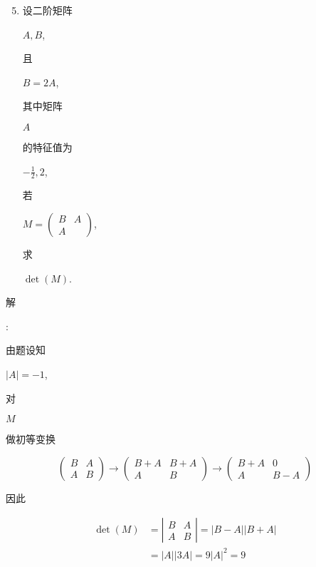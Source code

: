 \documentclass[10pt]{article}
\begin{document}
\begin{enumerate}
  \setcounter{enumi}{4}
  \item \begin{CJK}{UTF8}{mj}设二阶矩阵\end{CJK} $A, B$, \begin{CJK}{UTF8}{mj}且\end{CJK} $B=2 A$, \begin{CJK}{UTF8}{mj}其中矩阵\end{CJK} $A$ \begin{CJK}{UTF8}{mj}的特征值为\end{CJK} $-\frac{1}{2}, 2$, \begin{CJK}{UTF8}{mj}若\end{CJK} $M=\left(\begin{array}{cc}B & A \\ A\end{array}\right)$, \begin{CJK}{UTF8}{mj}求\end{CJK} $\operatorname{det}(M)$.
\end{enumerate}
\begin{CJK}{UTF8}{mj}解\end{CJK}: \begin{CJK}{UTF8}{mj}由题设知\end{CJK} $|A|=-1$, \begin{CJK}{UTF8}{mj}对\end{CJK} $M$ \begin{CJK}{UTF8}{mj}做初等变换\end{CJK}
$$
\left(\begin{array}{ll}
B & A \\
A & B
\end{array}\right) \rightarrow\left(\begin{array}{cc}
B+A & B+A \\
A & B
\end{array}\right) \rightarrow\left(\begin{array}{cc}
B+A & 0 \\
A & B-A
\end{array}\right)
$$
\begin{CJK}{UTF8}{mj}因此\end{CJK}
$$
\begin{aligned}
\operatorname{det}(M) &=\left|\begin{array}{lr}
B & A \\
A & B
\end{array}\right|=|B-A||B+A| \\
&=|A||3 A|=9|A|^{2}=9
\end{aligned}
$$
\end{document}
